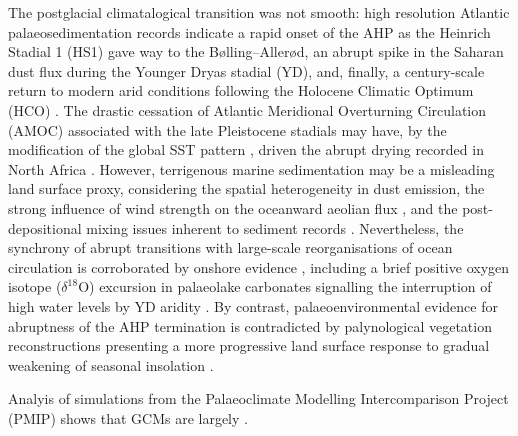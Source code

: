 \documentclass[a4paper]{article}
\newcommand{\delO}{\ensuremath{\delta ^{18}}O}
\begin{document}
The postglacial climatalogical transition was not smooth: high resolution Atlantic palaeosedimentation records indicate a rapid onset of the AHP as the Heinrich Stadial 1 (HS1) gave way to the Bølling–Allerød, an abrupt spike in the Saharan dust flux during the Younger Dryas stadial (YD), and, finally, a century-scale return to modern arid conditions following the Holocene Climatic Optimum (HCO) \parencite{demenocal2000abrupt, kuhlmann2004transition, adkins2006african, mcgee2013magnitude, ehrmann2013dynamics, collins2013abrupt, williams2016glacial}.
The drastic cessation of Atlantic Meridional Overturning Circulation (AMOC) associated with the late Pleistocene stadials \parencite{mcmanus2004collapse, lynch2017atlantic} may have, by the modification of the global SST pattern \parencite{boyle1987north, kiefer2005patterns, kienast2006eastern, barker2009interhemispheric}, driven the abrupt drying recorded in North Africa \parencite{mulitza2008sahel, collins2013abrupt}. 
However, terrigenous marine sedimentation may be a misleading land surface proxy, considering the spatial heterogeneity in dust emission, the strong influence of wind strength on the oceanward aeolian flux \parencite{ruddiman1997tropical, mcgee2010gustiness, parker2016new}, and the post-depositional mixing issues inherent to sediment records \parencite{mahowald1999dust, giresse2003late, maslin2003evidence}.
Nevertheless, the synchrony of abrupt transitions with large-scale reorganisations of ocean circulation is corroborated by onshore evidence \parencite{gasse1994abrupt, garcin2007abrupt, talbot2007abrupt}, including a brief positive oxygen isotope (\delO) excursion in palaeolake carbonates signalling the interruption of high water levels by YD aridity \parencite{gasse1990arid}.
By contrast, palaeoenvironmental evidence for abruptness of the AHP termination \parencite{gasse1990arid, salzmann2005dahomey, tierney2013abrupt, tierney2017rainfall} is contradicted by palynological vegetation reconstructions presenting a more progressive land surface response to gradual weakening of seasonal insolation \parencite{kropelin2008climate, lezine2009timing, vincens2010vegetation, amaral2013palynological, shanahan2015time}. 

Analyis of simulations from the Palaeoclimate Modelling Intercomparison Project (PMIP) shows that GCMs are largely \parencite{braconnot2012evaluation, zheng2013characterization, harrison2015evaluation}. 

\end{document}
